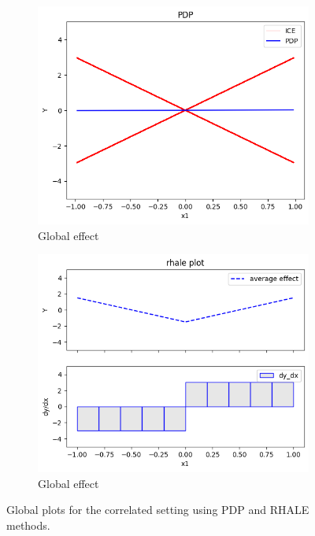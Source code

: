 \documentclass[
twocolumn,
]{ceurart}
\begin{document}
\begin{figure}[t]
    \centering
    \begin{subfigure}[b]{0.24\textwidth}
        \centering
        \includegraphics[width=\textwidth]{figures/simulation_1/cor_global_pdp.png}
        \caption{Global effect}
        \label{subfig:global_pdp_correlated}
    \end{subfigure}
    \begin{subfigure}[b]{0.24\textwidth}
        \centering
        \includegraphics[width=\textwidth]{figures/simulation_1/cor_global_rhale.png}
        \caption{Global effect}
        \label{subfig:global_rhale_correlated}
    \end{subfigure}
    \caption{Global plots for the correlated setting using PDP and RHALE methods.}
    \label{fig:synthetic-1-correlated}
  \end{figure}
  
\end{document}
